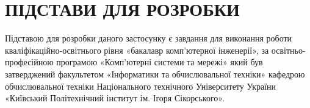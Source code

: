 \begingroup
\renewcommand{\cleardoublepage}{}
\renewcommand{\clearpage}{}
\chapter{ПІДСТАВИ ДЛЯ РОЗРОБКИ}
\endgroup

Підставою для розробки даного застосунку є завдання для  виконання роботи кваліфікаційно-освітнього рівня «бакалавр комп'ютерної інженерії», за освітньо-професійною програмою «Комп’ютерні системи та мережі» який був затверджений факультетом «Інформатики та обчислювальної техніки» кафедрою обчислювальної техніки Національного технічного Університету України «Київський Політехнічний інститут ім. Ігоря Сікорського».

\bigskip
\bigskip
\bigskip
\bigskip